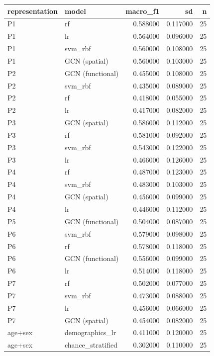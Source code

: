 \begin{tabular}{llrrr}
\toprule
representation & model & macro_f1 & sd & n \\
\midrule
P1 & rf & 0.588000 & 0.117000 & 25 \\
P1 & lr & 0.564000 & 0.096000 & 25 \\
P1 & svm_rbf & 0.560000 & 0.108000 & 25 \\
P1 & GCN (spatial) & 0.560000 & 0.103000 & 25 \\
P2 & GCN (functional) & 0.455000 & 0.108000 & 25 \\
P2 & svm_rbf & 0.435000 & 0.089000 & 25 \\
P2 & rf & 0.418000 & 0.055000 & 25 \\
P2 & lr & 0.417000 & 0.082000 & 25 \\
P3 & GCN (spatial) & 0.586000 & 0.112000 & 25 \\
P3 & rf & 0.581000 & 0.092000 & 25 \\
P3 & svm_rbf & 0.543000 & 0.122000 & 25 \\
P3 & lr & 0.466000 & 0.126000 & 25 \\
P4 & rf & 0.487000 & 0.123000 & 25 \\
P4 & svm_rbf & 0.483000 & 0.103000 & 25 \\
P4 & GCN (spatial) & 0.456000 & 0.099000 & 25 \\
P4 & lr & 0.446000 & 0.112000 & 25 \\
P5 & GCN (functional) & 0.504000 & 0.087000 & 25 \\
P6 & svm_rbf & 0.579000 & 0.098000 & 25 \\
P6 & rf & 0.578000 & 0.118000 & 25 \\
P6 & GCN (functional) & 0.556000 & 0.099000 & 25 \\
P6 & lr & 0.514000 & 0.118000 & 25 \\
P7 & rf & 0.502000 & 0.077000 & 25 \\
P7 & svm_rbf & 0.473000 & 0.088000 & 25 \\
P7 & lr & 0.456000 & 0.066000 & 25 \\
P7 & GCN (spatial) & 0.454000 & 0.082000 & 25 \\
age+sex & demographics_lr & 0.411000 & 0.120000 & 25 \\
age+sex & chance_stratified & 0.302000 & 0.110000 & 25 \\
\bottomrule
\end{tabular}
